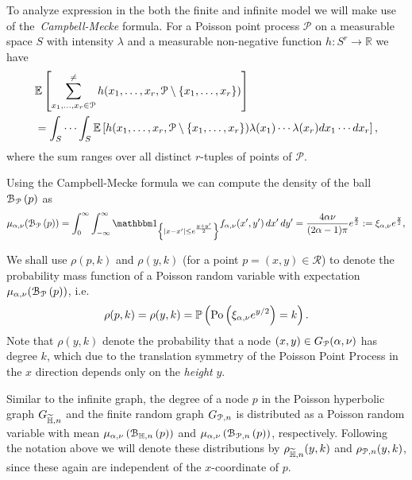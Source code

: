 To analyze expression in the both the finite and infinite model we will make use of the~\emph{Campbell-Mecke} formula. 
For a Poisson point process $\mathcal{P}$ on a measurable space $S$ with intensity $\lambda$ and a measurable non-negative function $h: S^r \rightarrow \mathbb{R}$ we have
\begin{equation}\label{eq:def_Campbell-Mecke}
\begin{split}
& \mathbb{E}\left[\sum_{x_1,\ldots, x_r \in \mathcal{P}}^{\neq} h (x_1, \ldots, x_r,
\mathcal{P} \setminus \{x_1,\ldots, x_r\}) \right]\\
& = \int_S \cdots \int_S
\mathbb{E}\left[h(x_1,\ldots, x_r,\mathcal{P} \setminus \{x_1,\ldots, x_r\}) \lambda (x_1) \cdots \lambda (x_r) dx_1 \cdots dx_r\right],
\end{split}
\end{equation}
where the sum ranges over all distinct $r$-tuples of points of $\mathcal{P}$.

Using the Campbell-Mecke formula we can compute the density of the ball ${\mathcal B}_{{\mathcal P}}\left(p\right)$ as
\begin{equation}\label{eq:mu_ball_y_P}
	\mu_{\alpha, \nu}(\BallPo{p}) = \int_0^\infty \int_{-\infty}^\infty \ind{|x-x^\prime| \le e^{\frac{y + y^\prime}{2}}}
	f_{\alpha,\nu}(x^\prime, y^\prime) \, dx^\prime \, dy^\prime 
	= \frac{4\alpha \nu}{(2\alpha - 1)\pi} e^{\frac{y}{2}} := \xi_{\alpha,\nu}e^{\frac{y}{2}},
\end{equation}

We shall use $\rho(p,k)$ and $\rho(y,k)$ (for a point $p=(x,y) \in \mathcal{R}$) to denote the probability mass function of a Poisson random variable with expectation $\mu_{\alpha, \nu}({\mathcal B}_{{\mathcal P}}\left(p\right))$, i.e.
\[
	\rho(p,k) = \rho(y,k) = \mathbb{P}\left({\mathrm{Po}}\left(\xi_{\alpha,\nu} e^{y/2}\right) = k\right).
\]
Note that $\rho(y,k)$ denote the probability that a node $(x,y) \in G_{{\mathcal P}}(\alpha,\nu)$ has degree $k$, which due to the translation symmetry of the Poisson Point Process in the $x$ direction depends only on the \emph{height} $y$.

\begin{remark}
Similar to the infinite graph, the degree of a node $p$ in the Poisson hyperbolic graph $G_{\widetilde{\mathbb{H}},n}$ and the finite random graph $G_{{\mathcal P},n}$ is distributed as a Poisson random variable with mean $\mu_{\alpha,\nu}\left({\mathcal B}_{\mathbb{H},n}\left(p\right)\right)$ and $\mu_{\alpha,\nu}\left({\mathcal B}_{{\mathcal P},n}\left(p\right)\right)$, respectively. Following the notation above we will denote these distributions by $\rho_{\widetilde{\mathbb{H}},n}(y,k)$ and $\rho_{{\mathcal P},n}(y,k)$, since these again are independent of the $x$-coordinate of $p$.
\end{remark}

